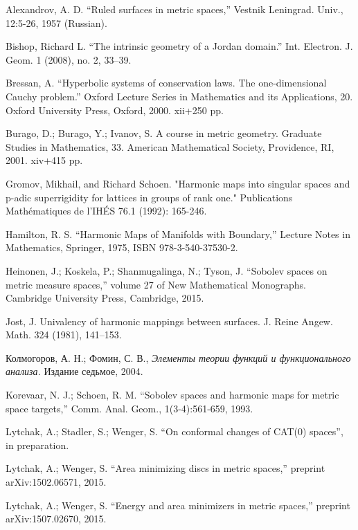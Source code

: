 \documentclass{article}
\begin{document}
\begin{thebibliography}{52}

 Alexandrov, A. D. ``Ruled  surfaces  in  metric  spaces,'' Vestnik Leningrad. Univ., 12:5-26, 1957 (Russian).

Bishop, Richard L.
``The intrinsic geometry of a Jordan domain.''
Int. Electron. J. Geom. 1 (2008), no. 2, 33--39. 

 Bressan, A.
``Hyperbolic systems of conservation laws.
The one-dimensional Cauchy problem.'' 
Oxford Lecture Series in Mathematics and its Applications, 20. 
Oxford University Press, Oxford, 2000. 
xii+250 pp.

Burago, D.; Burago, Y.; Ivanov, S.
A course in metric geometry.
Graduate Studies in Mathematics, 33. American Mathematical Society, Providence, RI, 2001. xiv+415 pp.

 Gromov, Mikhail, and Richard Schoen. "Harmonic maps into singular spaces and p-adic superrigidity for lattices in groups of rank one." Publications Mathématiques de l'IHÉS 76.1 (1992): 165-246.

 Hamilton, R. S. ``Harmonic Maps of Manifolds with Boundary,'' Lecture Notes in Mathematics, Springer, 1975, ISBN 978-3-540-37530-2.

 Heinonen, J.;  Koskela, P.;  Shanmugalinga, N.; Tyson, J. ``Sobolev spaces on metric measure spaces,''
volume 27 of New Mathematical Monographs. Cambridge University Press, Cambridge, 2015.

 Jost, J.
Univalency of harmonic mappings between surfaces.
J. Reine Angew. Math. 324 (1981), 141--153. 

\begin{otherlanguage}{russian}
Колмогоров, А. Н.;
Фомин, С. В.,
\textit{Элементы теории функций и функционального анализа.}
Издание седьмое, 2004.
\end{otherlanguage}

Korevaar, N. J.; Schoen, R. M. ``Sobolev spaces and harmonic maps for metric space targets,'' Comm. Anal. Geom., 1(3-4):561-659, 1993.

 Lytchak, A.; Stadler, S.; Wenger, S.  ``On conformal changes of CAT(0) spaces'', in preparation.

Lytchak, A.; Wenger, S. ``Area minimizing discs in metric spaces,'' preprint arXiv:1502.06571, 2015.

Lytchak, A.; Wenger, S. ``Energy and area minimizers in metric spaces,'' preprint  arXiv:1507.02670, 2015.


\end{thebibliography}
\end{document}
